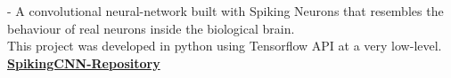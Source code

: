 - A convolutional neural-network built with Spiking Neurons that resembles the behaviour of real neurons inside the biological brain.\\
This project was developed in python using Tensorflow API at a very low-level.\\
\href{https://github.com/dinies/SpikingCNN}{\textbf{SpikingCNN-Repository}}

